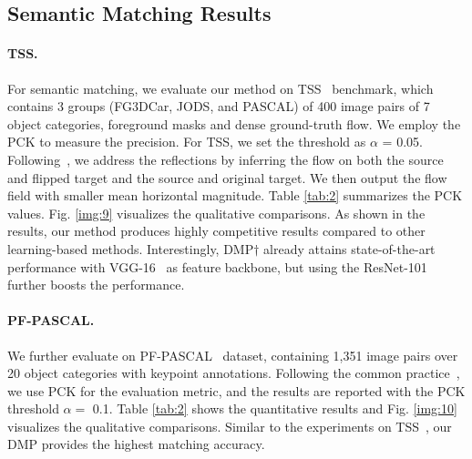 \documentclass[10pt,twocolumn,letterpaper]{article}
\newcommand{\figref}[1]{Fig. \ref{#1}}
\newcommand{\tabref}[1]{Table \ref{#1}}
\begin{document}
\subsection{Semantic Matching Results}\label{sec:4_4}
\paragraph{TSS.}
For semantic matching, we evaluate our method on TSS~\cite{taniai2016joint} benchmark, which contains 3 groups (FG3DCar, JODS, and PASCAL) of 400 image pairs of 7 object categories, foreground masks and dense ground-truth flow. We employ the PCK to measure the precision. For TSS, we set the threshold as $\alpha$ = 0.05. Following~\cite{truong2020glu}, we address the reflections by inferring the flow on both the source and flipped target and the source and original target. We then output the flow field with smaller mean horizontal magnitude. \tabref{tab:2} summarizes the PCK values. \figref{img:9} visualizes the qualitative comparisons. As shown in the results, our method produces highly competitive results compared to other learning-based methods. Interestingly, DMP$\dagger$ already attains state-of-the-art performance with VGG-16~\cite{simonyan2014very} as feature backbone, but using the ResNet-101~\cite{he2016deep} further boosts the performance.
\vspace{-10pt}

\paragraph{PF-PASCAL.}
We further evaluate on PF-PASCAL~\cite{ham2016proposal} dataset, containing 1,351 image pairs over 20 object categories with keypoint annotations. Following the common practice~\cite{rocco2018neighbourhood,han2017scnet}, we use PCK for the evaluation metric, and the results are reported with the PCK threshold $\alpha=$ 0.1. 
\tabref{tab:2} shows the quantitative results and \figref{img:10} visualizes the qualitative comparisons. Similar to the experiments on TSS~\cite{taniai2016joint}, our DMP provides the highest matching accuracy. 
\end{document}
